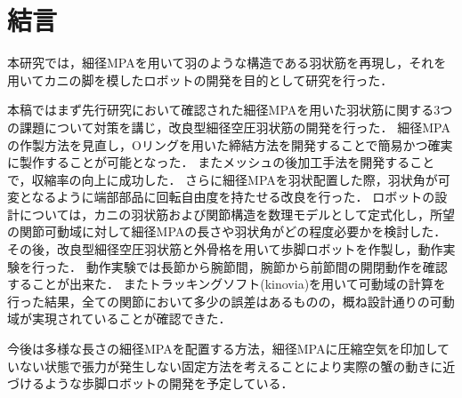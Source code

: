\newpage
\section{結言}
本研究では，細径MPAを用いて羽のような構造である羽状筋を再現し，それを用いてカニの脚を模したロボットの開発を目的として研究を行った．


本稿ではまず先行研究において確認された細径MPAを用いた羽状筋に関する3つの課題について対策を講じ，改良型細径空圧羽状筋の開発を行った．
細径MPAの作製方法を見直し，Oリングを用いた締結方法を開発することで簡易かつ確実に製作することが可能となった．
またメッシュの後加工手法を開発することで，収縮率の向上に成功した．
さらに細径MPAを羽状配置した際，羽状角が可変となるように端部部品に回転自由度を持たせる改良を行った．
ロボットの設計については，カニの羽状筋および関節構造を数理モデルとして定式化し，所望の関節可動域に対して細径MPAの長さや羽状角がどの程度必要かを検討した．
その後，改良型細径空圧羽状筋と外骨格を用いて歩脚ロボットを作製し，動作実験を行った．
動作実験では長節から腕節間，腕節から前節間の開閉動作を確認することが出来た．
またトラッキングソフト(kinovia)を用いて可動域の計算を行った結果，全ての関節において多少の誤差はあるものの，概ね設計通りの可動域が実現されていることが確認できた．


今後は多様な長さの細径MPAを配置する方法，細径MPAに圧縮空気を印加していない状態で張力が発生しない固定方法を考えることにより実際の蟹の動きに近づけるような歩脚ロボットの開発を予定している．